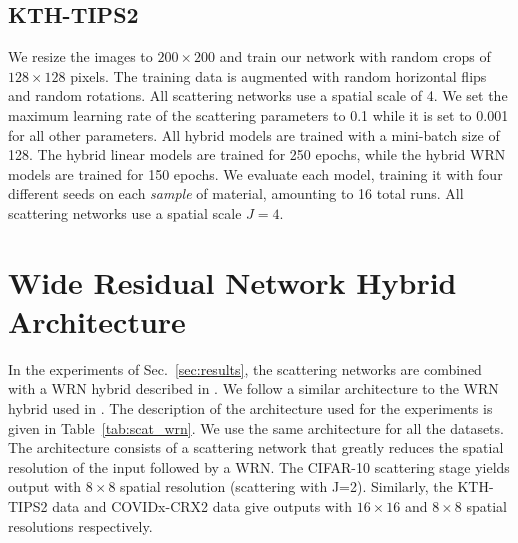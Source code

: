 \documentclass[10pt,twocolumn,letterpaper]{article}
\begin{document}
\subsection{KTH-TIPS2}
\label{appendix:detail-kth}
We resize the images to $200 \times 200$ and train our network with random crops of $128 \times 128$ pixels. The training data is augmented with random horizontal flips and random rotations. All scattering networks use a spatial scale of 4. We set the maximum learning rate of the scattering parameters to 0.1 while it is set to 0.001 for all other parameters. All hybrid models are trained with a mini-batch size of 128. The hybrid linear models are trained for 250 epochs, while the hybrid WRN models are trained for 150 epochs. We evaluate each model, training it with four different seeds on each \emph{sample} of material, amounting to 16 total runs. All scattering networks use a spatial scale $J=4$.

\section{Wide Residual Network Hybrid Architecture}

\label{appendix-wrn}
In the experiments of Sec.~\ref{sec:results}, the scattering networks are combined with a WRN hybrid described in \cite{oyallon2017scaling}. We follow a similar architecture to the WRN hybrid used in \cite{oyallon2018replearning}. The description of the architecture used for the experiments is given in Table~\ref{tab:scat_wrn}. We use the same architecture for all the datasets. The architecture consists of a scattering network that greatly reduces the spatial resolution of the input followed by a WRN. The CIFAR-10 scattering stage yields output with $8\times8$ spatial resolution (scattering with J=2). Similarly, the KTH-TIPS2 data and COVIDx-CRX2 data give outputs with $16\times16$ and $8\times8$ spatial resolutions respectively. 
\end{document}

